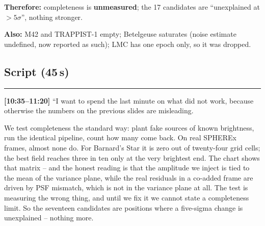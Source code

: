 \documentclass[11pt,a4paper]{article}
\begin{document}
\textbf{Therefore:} completeness is \textbf{unmeasured}; the 17 candidates are ``unexplained at
$>5\sigma$'', nothing stronger.

\textbf{Also:} M42 and TRAPPIST-1 empty; Betelgeuse saturates (noise estimate undefined, now reported
as such); LMC has one epoch only, so it was dropped.

\begin{center}
\end{center}

\subsection*{Script (45\,s)}
\noindent\rule{\linewidth}{0.3pt}\par\smallskip\noindent
\textbf{[10:35--11:20]} ``I want to spend the last minute on what did not work, because otherwise the
numbers on the previous slides are misleading.

We test completeness the standard way: plant fake sources of known brightness, run the identical
pipeline, count how many come back. On real SPHEREx frames, almost none do. For Barnard's Star it is
zero out of twenty-four grid cells; the best field reaches three in ten only at the very brightest end.
The chart shows that matrix -- and the honest reading is that the amplitude we inject is tied to the
mean of the variance plane, while the real residuals in a co-added frame are driven by PSF mismatch,
which is not in the variance plane at all. The test is measuring the wrong thing, and until we fix it we
cannot state a completeness limit. So the seventeen candidates are positions where a five-sigma change
is unexplained -- nothing more.
\end{document}
